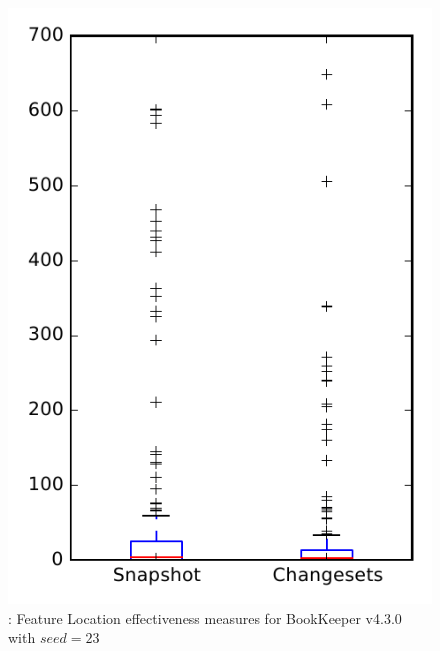 
\begin{figure}
\centering
\includegraphics[height=0.4\textheight]{figures/flt_seed/rq1_bookkeeper_23}
\caption{\rone: Feature Location effectiveness measures for BookKeeper v4.3.0 with $seed=23$}
\label{fig:flt_seed:rq1:bookkeeper}
\end{figure}
